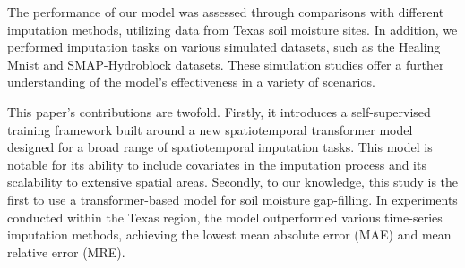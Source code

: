 \documentclass[11pt]{article}
\begin{document}
The performance of our model was assessed through comparisons with different imputation methods, utilizing data from Texas soil moisture sites. In addition, we performed imputation tasks on various simulated datasets, such as the Healing Mnist and SMAP-Hydroblock datasets. These simulation studies offer a further understanding of the model's effectiveness in a variety of scenarios.


This paper's contributions are twofold. Firstly, it introduces a self-supervised training framework built around a new spatiotemporal transformer model designed for a broad range of spatiotemporal imputation tasks. This model is notable for its ability to include covariates in the imputation process and its scalability to extensive spatial areas. Secondly, to our knowledge, this study is the first to use a transformer-based model for soil moisture gap-filling. In experiments conducted within the Texas region, the model outperformed various time-series imputation methods, achieving the lowest mean absolute error (MAE) and mean relative error (MRE).
\end{document}
